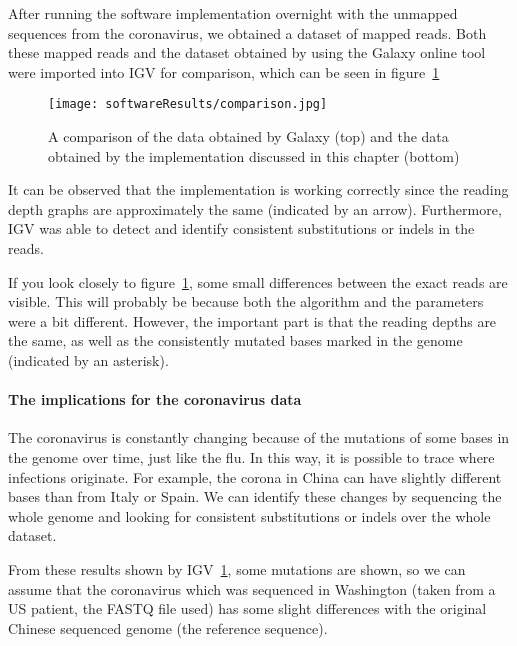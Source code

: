 After running the software implementation overnight with the unmapped sequences from the coronavirus, we obtained a dataset of mapped reads. Both these mapped reads and the dataset obtained by using the Galaxy online tool were imported into IGV for comparison, which can be seen in figure~\ref{fig:IGVcomparison}

\begin{figure}[H]
	\centering
	\texttt{[image: softwareResults/comparison.jpg]}
	\caption{A comparison of the data obtained by Galaxy (top) and the data obtained by the implementation discussed in this chapter (bottom)}
	\label{fig:IGVcomparison}
\end{figure}

It can be observed that the implementation is working correctly since the reading depth graphs are approximately the same (indicated by an arrow). Furthermore, IGV was able to detect and identify consistent substitutions or indels in the reads.

If you look closely to figure~\ref{fig:IGVcomparison}, some small differences between the exact reads are visible. This will probably be because both the algorithm and the parameters were a bit different. However, the important part is that the reading depths are the same, as well as the consistently mutated bases marked in the genome (indicated by an asterisk).


\paragraph{The implications for the coronavirus data}
The coronavirus is constantly changing because of the mutations of some bases in the genome over time, just like the flu. In this way, it is possible to trace where infections originate. For example, the corona in China can have slightly different bases than from Italy or Spain. We can identify these changes by sequencing the whole genome and looking for consistent substitutions or indels over the whole dataset.

From these results shown by IGV~\ref{fig:IGVcomparison}, some mutations are shown, so we can assume that the coronavirus which was sequenced in Washington (taken from a US patient, the FASTQ file used) has some slight differences with the original Chinese sequenced genome (the reference sequence).

